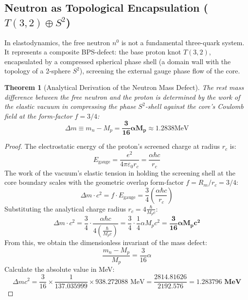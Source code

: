 \documentclass[12pt,a4paper]{article}
\newtheorem{theorem}{Theorem}
\begin{document}
		\subsection{Neutron as Topological Encapsulation ($T(3,2) \oplus S^2$)}
		In elastodynamics, the free neutron $n^0$ is not a fundamental three-quark system. It represents a composite BPS-defect: the base proton knot $T(3,2)$, encapsulated by a compressed spherical phase shell (a domain wall with the topology of a 2-sphere $S^2$), screening the external gauge phase flow of the core.
		
		\begin{theorem}[Analytical Derivation of the Neutron Mass Defect]
			The rest mass difference between the free neutron and the proton is determined by the work of the elastic vacuum in compressing the phase $S^2$-shell against the core's Coulomb field at the form-factor $f = 3/4$:
			\begin{equation}
				\Delta m \equiv m_n - M_p = \mathbf{\frac{3}{16} \alpha M_p} \approx \mathbf{1.2838 \mathrm{MeV}}
			\end{equation}
		\end{theorem}
		
		\begin{proof}
			The electrostatic energy of the proton's screened charge at radius $r_c$ is:
			\begin{equation}
				E_{\text{gauge}} = \frac{e^2}{4\pi \varepsilon_0 r_c} = \frac{\alpha \hbar c}{r_c}
			\end{equation}
			The work of the vacuum's elastic tension in holding the screening shell at the core boundary scales with the geometric overlap form-factor $f = R_m / r_c = 3/4$:
			\begin{equation}
				\Delta m \cdot c^2 = f \cdot E_{\text{gauge}} = \frac{3}{4} \left( \frac{\alpha \hbar c}{r_c} \right)
			\end{equation}
			Substituting the analytical charge radius $r_c = 4 \frac{\hbar}{M_p c}$:
			\begin{equation}
				\Delta m \cdot c^2 = \frac{3}{4} \cdot \frac{\alpha \hbar c}{4 \left( \frac{\hbar}{M_p c} \right)} = \frac{3}{4} \cdot \frac{1}{4} \alpha M_p c^2 = \mathbf{\frac{3}{16} \alpha M_p c^2}
			\end{equation}
			From this, we obtain the dimensionless invariant of the mass defect:
			\begin{equation}
				\frac{m_n - M_p}{M_p} = \frac{3}{16} \alpha
			\end{equation}
			Calculate the absolute value in MeV:
			\begin{equation}
				\Delta m c^2 = \frac{3}{16} \times \frac{1}{137.035999} \times 938.272088 \text{ MeV} = \frac{2814.81626}{2192.576} = \mathbf{1.283796 \text{ MeV}}
			\end{equation}
		\end{proof}
		
\end{document}
